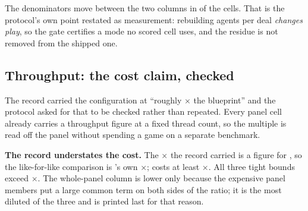 The denominators move between the two columns in \vsevenSsixDenomMoved{} of the cells. That is the
protocol's own point restated as measurement: rebuilding agents per deal \emph{changes play}, so the
gate certifies a mode no scored cell uses, and the residue is not removed from the shipped one.

\subsection{Throughput: the cost claim, checked}
\label{sec:results-cost}

The record carried the configuration at ``roughly \vsevenCostRecorded$\times$ the blueprint'' and the
protocol asked for that to be checked rather than repeated. Every panel cell already carries a
throughput figure at a fixed thread count, so the multiple is read off the panel without spending a
game on a separate benchmark.

\begin{table}[t]\centering
\caption{Cost relative to the blueprint. Every figure is a \emph{lower bound}: the harness reports
whole-match throughput, which carries the opponent's cost on both sides of the ratio, so the measured
ratio is strictly below the true one. The bound is tightest against the cheapest opponent. No figure
here carries an interval --- these are wall-clock timings taken across a battery that ran over two
days --- and the aggregation is a ratio of medians, which differs from a median of per-bank ratios --- the aggregation the
phase-5 reduction uses --- by at most $\vsevenCostAggDelta\times$ across the six median cells, and
not at all on the \texttt{random} column that carries the claim.}
\label{tab:cost}
{\small}
\end{table}

\textbf{The record understates the cost.} The \vsevenCostRecorded$\times$ the record carried is a
figure for \fcheap{}, so the like-for-like comparison is \fcheap{}'s own
\vsevenCostFcheapTight$\times$; \frozen{} costs at least \vsevenCostFrozenTight$\times$. All three
tight bounds exceed \vsevenCostRecorded$\times$. The whole-panel column is lower only because the expensive panel members
put a large common term on both sides of the ratio; it is the most diluted of the three and is printed
last for that reason.
